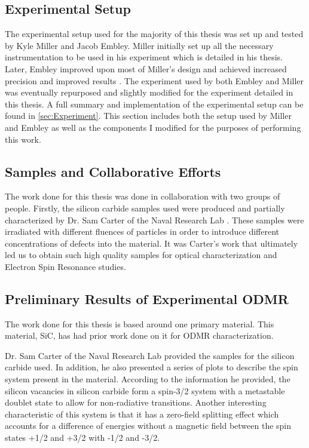 \documentclass[oneside, astronomy, noacknowlegments]{BYUPhys}
\begin{document}
\subsection{Experimental Setup}

The experimental setup used for the majority of this thesis was set up and tested by Kyle Miller and Jacob Embley. Miller initially set up all the necessary instrumentation to be used in his experiment which is detailed in his thesis. Later, Embley improved upon most of Miller's design and achieved increased precision and improved results \cite{RefWorks:doc:5892912ae4b0dec22aee3993}. The experiment used by both Embley and Miller was eventually repurposed and slightly modified for the experiment detailed in this thesis. A full summary and implementation of the experimental setup can be found in \ref{sec:Experiment}. This section includes both the setup used by Miller and Embley as well as the components I modified for the purposes of performing this work.

\subsection{Samples and Collaborative Efforts}

The work done for this thesis was done in collaboration with two groups of people. Firstly, the silicon carbide samples used were produced and partially characterized by Dr. Sam Carter of the Naval Research Lab \cite{RefWorks:doc:5892964ee4b0499fa95c5108}. These samples were irradiated with different fluences of particles in order to introduce different concentrations of defects into the material. It was Carter's work that ultimately led us to obtain such high quality samples for optical characterization and Electron Spin Resonance studies.

\subsection{Preliminary Results of Experimental ODMR}

The work done for this thesis is based around one primary material. This material, SiC, has had prior work done on it for ODMR characterization.

Dr. Sam Carter of the Naval Research Lab provided the samples for the silicon carbide used. In addition, he also presented a series of plots to describe the spin system present in the material. According to the information he provided, the silicon vacancies in silicon carbide form a spin-3/2 system with a metastable doublet state to allow for non-radiative transitions. Another interesting characteristic of this system is that it has a zero-field splitting effect which accounts for a difference of energies without a magnetic field between the spin states +1/2 and +3/2 with -1/2 and -3/2.
 
\end{document}
